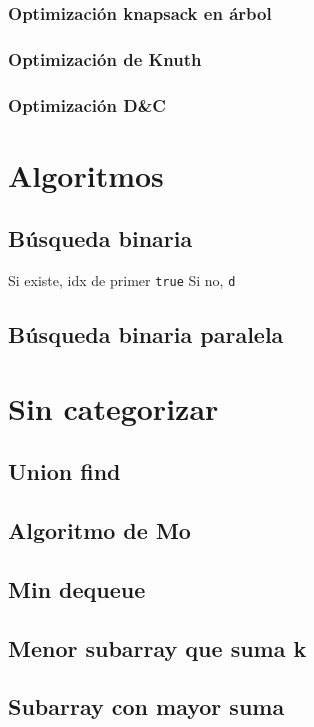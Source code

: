     \subsubsection{Optimización knapsack en árbol}
    \subsubsection{Optimización de Knuth}
    \subsubsection{Optimización D\&C}

\section{Algoritmos}
    \subsection{Búsqueda binaria}
        Si existe, idx de primer \texttt{true}
        Si no, \texttt{d}
    \subsection{Búsqueda binaria paralela}

\section{Sin categorizar}
    \subsection{Union find}
    \subsection{Algoritmo de Mo}
    \subsection{Min dequeue}
    \subsection{Menor subarray que suma k}
    \subsection{Subarray con mayor suma}
